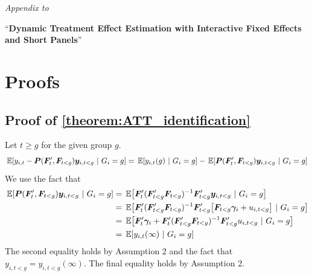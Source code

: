 \documentclass[12pt]{article}
\begin{document}
\setcounter{equation}{0}

\setcounter{theorem}{0}
\setcounter{proposition}{0} 
\setcounter{lemma}{0}
\setcounter{corollary}{0}
\setcounter{definition}{0}
\setcounter{assumption}{0}
\setcounter{remark}{0}
\renewcommand{\theequation}{\thesection.\arabic{equation}}
\renewcommand{\thetheorem}{\thesection.\arabic{theorem}}
\renewcommand{\theproposition}{\thesection.\arabic{proposition}}
\renewcommand{\thelemma}{\thesection.\arabic{lemma}}
\renewcommand{\thecorollary}{\thesection.\arabic{corollary}}
\renewcommand{\thedefinition}{\thesection.\arabic{definition}}
\renewcommand{\theassumption}{\thesection.\arabic{assumption}}
\renewcommand{\theremark}{\thesection.\arabic{remark}}

\begin{center}
    \emph{Appendix to}
    
    {\large ``\textbf{Dynamic Treatment Effect Estimation with Interactive Fixed Effects and Short Panels}''}
\end{center}

\section{Proofs}\label{sec:proofs}



\subsection*{Proof of \autoref{theorem:ATT_identification}}

Let $t \geq g$ for the given group $g$.
\begin{equation*}
    \expec{y_{i,t} - \bm P(\bm{F}_{t}', \bm{F}_{t < g}) \bm y_{i,t < g}}{G_i = g} = \expec{y_{i,t}(g)}{G_i = g} - \expec{\bm P(\bm{F}_{t}', \bm{F}_{t < g}) \bm y_{i,t < g}}{G_i = g} 
\end{equation*}
We use the fact that 
\begin{align*}
    \expec{ \bm P(\bm{F}_{t}', \bm{F}_{t < g}) \bm y_{i,t < g} }{G_i = g} 
    &= \expec{ \bm{F}_{t}' (\bm{F}_{t < g}' \bm{F}_{t < g})^{-1} \bm{F}_{t < g}' \bm y_{i,t < g} }{G_i = g} \\
    &= \expec{ \bm{F}_{t}' (\bm{F}_{t < g}' \bm{F}_{t < g})^{-1} \bm{F}_{t < g}' \big[\bm{F}_{t < g} \bm \gamma_i + u_{i,t < g} \big] }{G_i = g} \\
    &= \expec{ \bm{F}_{t}' \bm \gamma_i + \bm{F}_{t}' (\bm{F}_{t < g}' \bm{F}_{t < g})^{-1} \bm{F}_{t < g}' u_{i,t < g} }{G_i = g} \\
    &= \expec{ y_{i,t}(\infty) }{G_i = g} 
\end{align*}
The second equality holds by Assumption 2 and the fact that $y_{i,t < g} = y_{i, t < g}(\infty)$. The final equality holds by Assumption 2.
\end{document}
